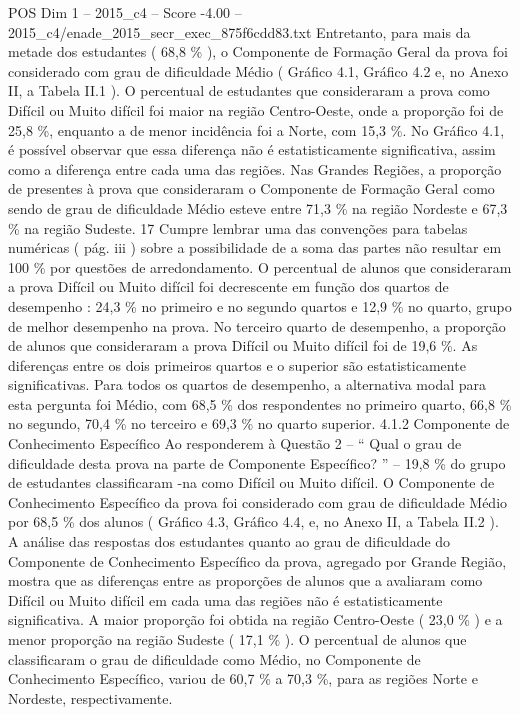 \begin{textsample}{POS Dim 1 – 2015\_c4 – Score -4.00 – 2015\_c4/enade\_2015\_secr\_exec\_875f6cdd83.txt}
Entretanto, para mais da metade dos estudantes ( 68,8 \% ), o Componente de Formação Geral da prova foi considerado com grau de dificuldade Médio ( Gráfico 4.1, Gráfico 4.2 e, no Anexo II, a Tabela II.1 ).
O percentual de estudantes que consideraram a prova como Difícil ou Muito difícil foi maior na região Centro-Oeste, onde a proporção foi de 25,8 \%, enquanto a de menor incidência foi a Norte, com 15,3 \%.
No Gráfico 4.1, é possível observar que essa diferença não é estatisticamente significativa, assim como a diferença entre cada uma das regiões.
Nas Grandes Regiões, a proporção de presentes à prova que consideraram o Componente de Formação Geral como sendo de grau de dificuldade Médio esteve entre 71,3 \% na região Nordeste e 67,3 \% na região Sudeste. 17 Cumpre lembrar uma das convenções para tabelas numéricas ( pág. iii ) sobre a possibilidade de a soma das partes não resultar em 100 \% por questões de arredondamento.
O percentual de alunos que consideraram a prova Difícil ou Muito difícil foi decrescente em função dos quartos de desempenho : 24,3 \% no primeiro e no segundo quartos e 12,9 \% no quarto, grupo de melhor desempenho na prova.
No terceiro quarto de desempenho, a proporção de alunos que consideraram a prova Difícil ou Muito difícil foi de 19,6 \%.
As diferenças entre os dois primeiros quartos e o superior são estatisticamente significativas.
Para todos os quartos de desempenho, a alternativa modal para esta pergunta foi Médio, com 68,5 \% dos respondentes no primeiro quarto, 66,8 \% no segundo, 70,4 \% no terceiro e 69,3 \% no quarto superior. 4.1.2 Componente de Conhecimento Específico Ao responderem à Questão 2 – “ Qual o grau de dificuldade desta prova na parte de Componente Específico? ” – 19,8 \% do grupo de estudantes classificaram -na como Difícil ou Muito difícil.
O Componente de Conhecimento Específico da prova foi considerado com grau de dificuldade Médio por 68,5 \% dos alunos ( Gráfico 4.3, Gráfico 4.4, e, no Anexo II, a Tabela II.2 ).
A análise das respostas dos estudantes quanto ao grau de dificuldade do Componente de Conhecimento Específico da prova, agregado por Grande Região, mostra que as diferenças entre as proporções de alunos que a avaliaram como Difícil ou Muito difícil em cada uma das regiões não é estatisticamente significativa.
A maior proporção foi obtida na região Centro-Oeste ( 23,0 \% ) e a menor proporção na região Sudeste ( 17,1 \% ).
O percentual de alunos que classificaram o grau de dificuldade como Médio, no Componente de Conhecimento Específico, variou de 60,7 \% a 70,3 \%, para as regiões Norte e Nordeste, respectivamente.

\end{textsample}
